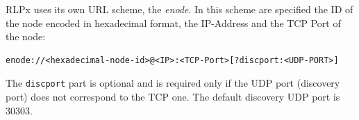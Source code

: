 RLPx uses its own URL scheme, the \emph{enode}. In this scheme are specified
the ID of the node encoded in hexadecimal format, the IP-Address and the 
TCP Port of the node:
\begin{verbatim}
enode://<hexadecimal-node-id>@<IP>:<TCP-Port>[?discport:<UDP-PORT>]
\end{verbatim}
The \verb|discport| part is optional and is required only if the UDP port
(discovery port) does not correspond to the TCP one. The default discovery UDP
port is 30303.

